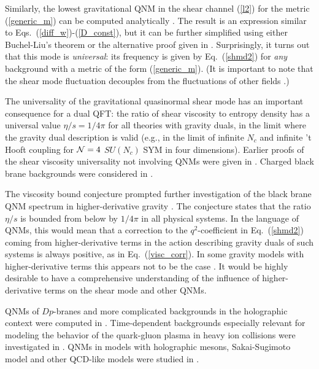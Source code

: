 \documentclass[]{iopart}
\begin{document}
Similarly, the lowest gravitational QNM in the shear channel (\ref{l2}) for
the metric (\ref{generic_m}) can be computed analytically
\cite{Starinets:2008fb}.  The result is an
expression similar to Eqs.~(\ref{diff_w})-(\ref{D_const}), but it can be
further simplified using either Buchel-Liu's theorem \cite{Buchel:2003tz} or
the alternative proof given in \cite{Son:2007vk}.  Surprisingly, it turns out
that this mode is {\it universal}: its frequency is given by Eq.~(\ref{shmd2})
for {\it any} background with a metric of the form (\ref{generic_m}). (It is
important to note that the shear mode fluctuation decouples from the
fluctuations of other fields \cite{Kovtun:2004de}.)

The universality of the gravitational quasinormal shear mode has an important
consequence for a dual QFT: the ratio of shear viscosity to entropy density
has a universal value $\eta/s = 1/4\pi$ for all theories with gravity duals,
in the limit where the gravity dual description is valid (e.g., in the limit
of infinite $N_c$ and infinite 't Hooft coupling for ${\cal N}=4$ $SU(N_c)$
SYM in four dimensions). Earlier proofs of the shear viscosity universality
not involving QNMs were given in \cite{Kovtun:2004de, Buchel:2004qq}.  Charged
black brane backgrounds were considered in \cite{Son:2006em, Maeda:2006by,
  Mas:2008qs, Mas:2008ks,
  Ge:2008ak,Erdmenger:2008rm,Cremonini:2008tw,Matsuo:2009yu, Myers:2009ij}.

The viscosity bound conjecture \cite{Kovtun:2003wp} prompted further
investigation of the black brane QNM spectrum in higher-derivative gravity
\cite{Brigante:2007nu,Kats:2007mq,Brigante:2008gz,Buchel:2008vz,Buchel:2008ae,
  Cai:2009zv,Banerjee:2009wg,Ge:2009eh,Banerjee:2009fm}.  The conjecture
states that the ratio $\eta/s$ is bounded from below by $1/4\pi$ in all
physical systems. In the language of QNMs, this would mean that a correction
to the $q^2$-coefficient in Eq.~(\ref{shmd2}) coming from higher-derivative
terms in the action describing gravity duals of such systems is always
positive, as in Eq.~(\ref{visc_corr}).  In some gravity models with
higher-derivative terms this appears not to be the case
\cite{Brigante:2007nu,Kats:2007mq,Brigante:2008gz,Buchel:2008vz,Cremonini:2009sy}.
It would be highly desirable to have a comprehensive understanding of the
influence of higher-derivative terms on the shear mode and other QNMs.

QNMs of $Dp$-branes and more complicated backgrounds in the holographic
context were computed in \cite{Mas:2007ng, Maeda:2005cr, Benincasa:2005iv,
  Buchel:2005cv,Kanitscheider:2009as}.  Time-dependent backgrounds especially
relevant for modeling the behavior of the quark-gluon plasma in heavy ion
collisions were investigated in \cite{Janik:2006gp, Friess:2006kw,
  Michalogiorgakis:2006jc}.  QNMs in models with holographic mesons,
Sakai-Sugimoto model and other QCD-like models were studied in
\cite{Hoyos:2006gb,Myers:2007we,Erdmenger:2007ja,
  Myers:2008cj,Evans:2008tu,Evans:2008tv,Paredes:2008nf,
  Ammon:2009fe,Johnson:2009ev}.
\end{document}
